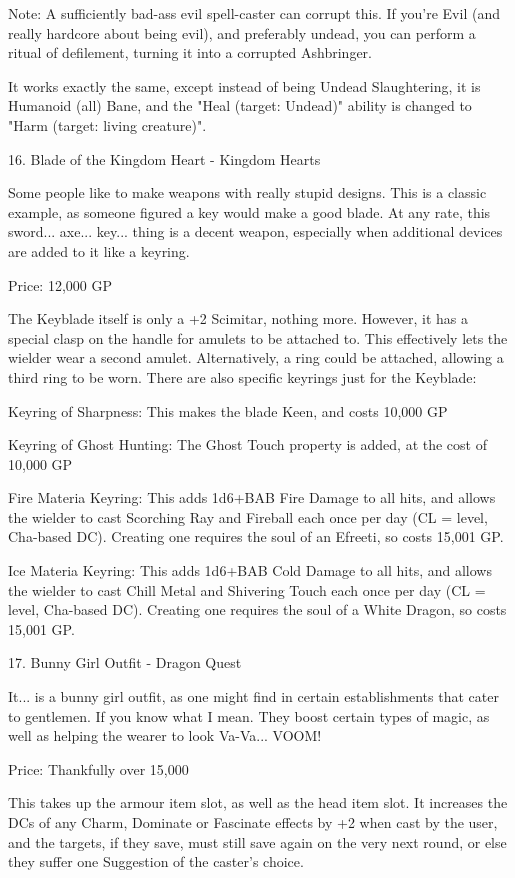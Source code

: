 \begin{multicols}{2}
Note: A sufficiently bad-ass evil spell-caster can corrupt this. If you're Evil (and really hardcore about being evil), and preferably undead, you can perform a ritual of defilement, turning it into a corrupted Ashbringer.

It works exactly the same, except instead of being Undead Slaughtering, it is Humanoid (all) Bane, and the "Heal (target: Undead)" ability is changed to "Harm (target: living creature)". 


16. Blade of the Kingdom Heart - Kingdom Hearts

Some people like to make weapons with really stupid designs. This is a classic example, as someone figured a key would make a good blade. At any rate, this sword... axe... key... thing is a decent weapon, especially when additional devices are added to it like a keyring.

Price: 12,000 GP

The Keyblade itself is only a +2 Scimitar, nothing more. However, it has a special clasp on the handle for amulets to be attached to. This effectively lets the wielder wear a second amulet. Alternatively, a ring could be attached, allowing a third ring to be worn. There are also specific keyrings just for the Keyblade:

Keyring of Sharpness: This makes the blade Keen, and costs 10,000 GP

Keyring of Ghost Hunting: The Ghost Touch property is added, at the cost of 10,000 GP

Fire Materia Keyring: This adds 1d6+BAB Fire Damage to all hits, and allows the wielder to cast Scorching Ray and Fireball each once per day (CL = level, Cha-based DC). Creating one requires the soul of an Efreeti, so costs 15,001 GP.

Ice Materia Keyring: This adds 1d6+BAB Cold Damage to all hits, and allows the wielder to cast Chill Metal and Shivering Touch each once per day (CL = level, Cha-based DC). Creating one requires the soul of a White Dragon, so costs 15,001 GP. 


17. Bunny Girl Outfit - Dragon Quest

It... is a bunny girl outfit, as one might find in certain establishments that cater to gentlemen. If you know what I mean. They boost certain types of magic, as well as helping the wearer to look Va-Va... VOOM!

Price: Thankfully over 15,000

This takes up the armour item slot, as well as the head item slot. It increases the DCs of any Charm, Dominate or Fascinate effects by +2 when cast by the user, and the targets, if they save, must still save again on the very next round, or else they suffer one Suggestion of the caster's choice.


\end{multicols}
